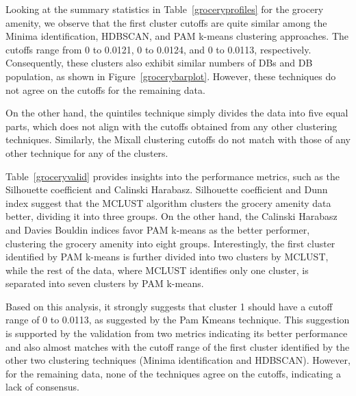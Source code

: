 \documentclass[11pt, a4paper]{article}
\begin{document}
Looking at the summary statistics in Table~\ref{groceryprofiles} for the grocery amenity, we observe that the first cluster cutoffs are quite similar among the Minima identification, HDBSCAN, and PAM k-means clustering approaches. The cutoffs range from 0 to 0.0121, 0 to 0.0124, and 0 to 0.0113, respectively. Consequently, these clusters also exhibit similar numbers of DBs and DB population, as shown in Figure~\ref{grocerybarplot}. However, these techniques do not agree on the cutoffs for the remaining data.
\par
On the other hand, the quintiles technique simply divides the data into five equal parts, which does not align with the cutoffs obtained from any other clustering techniques. Similarly, the Mixall clustering cutoffs do not match with those of any other technique for any of the clusters.
\par
Table~\ref{groceryvalid} provides insights into the performance metrics, such as the Silhouette coefficient and Calinski Harabasz. Silhouette coefficient and Dunn index suggest that the MCLUST algorithm clusters the grocery amenity data better, dividing it into three groups. On the other hand, the Calinski Harabasz and Davies Bouldin indices favor PAM k-means as the better performer, clustering the grocery amenity into eight groups. Interestingly, the first cluster identified by PAM k-means is further divided into two clusters by MCLUST, while the rest of the data, where MCLUST identifies only one cluster, is separated into seven clusters by PAM k-means.
\par
Based on this analysis, it strongly suggests that cluster 1 should have a cutoff range of 0 to 0.0113, as suggested by the Pam Kmeans technique. This suggestion is supported by the validation from two metrics indicating its better performance and also almost matches with the cutoff range of the first cluster identified by the other two clustering techniques (Minima identification and HDBSCAN). However, for the remaining data, none of the techniques agree on the cutoffs, indicating a lack of consensus.
\end{document}
